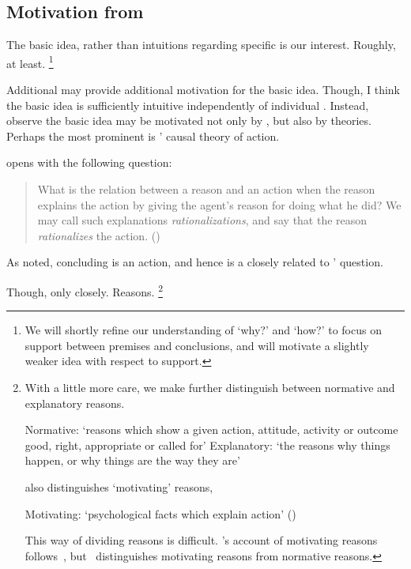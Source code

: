 \subsection{Motivation from \citeauthor{Davidson:1963aa}}

\begin{note}
  The basic idea, rather than intuitions regarding specific  is our interest.
  Roughly, at least.%
  \footnote{
    We will shortly refine our understanding of `why?' and `how?' to focus on support between premises and conclusions, and will motivate a slightly weaker idea with respect to support.
  }

  Additional  may provide additional motivation for the basic idea.
  Though, I think the basic idea is sufficiently intuitive independently of individual .
  Instead, observe the basic idea may be motivated not only by , but also by theories.
  Perhaps the most prominent is \citeauthor{Davidson:1963aa}' causal theory of action.

  \citeauthor{Davidson:1963aa} opens  with the following question:

  \begin{quote}
    What is the relation between a reason and an action when the reason explains the action by giving the agent's reason for doing what he did?
    We may call such explanations \emph{rationalizations}, and say that the reason \emph{rationalizes} the action.%
    \mbox{}\hfill\mbox{(\citeyear[685]{Davidson:1963aa})}
  \end{quote}

  As noted, concluding is an action, and hence \qWhy{} is a closely related to \citeauthor{Davidson:1963aa}' question.

  Though, only closely.
  Reasons.%
  \footnote{
    With a little more care, we make further distinguish between normative and explanatory reasons.

    Normative: `reasons which show a given action, attitude, activity or outcome good, right, appropriate or called for'
    Explanatory: `the reasons why things happen, or why things are the way they are'
    \citeyear[410]{Hieronymi:2011aa}

    \citeauthor{Hieronymi:2011aa} also distinguishes `motivating' reasons,

    Motivating: `psychological facts which explain action'
    (\citeyear[411--412]{Hieronymi:2011aa})

    This way of dividing reasons is difficult.
    \citeauthor{Hieronymi:2011aa}'s account of motivating reasons follows~\textcite{Smith:1994wo}, but~\citeauthor{Smith:1994wo} distinguishes motivating reasons from normative reasons.

}
\end{note}
